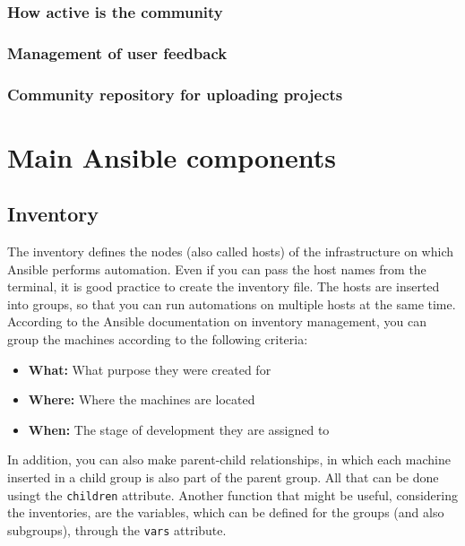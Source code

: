 \documentclass[12pt,a4paper,openright,twoside]{book}
\begin{document}
            \subsubsection{How active is the community}
            \subsubsection{Management of user feedback}
            \subsubsection{Community repository for uploading projects}

\section{Main Ansible components}

\subsection{Inventory}
            The inventory defines the nodes (also called hosts) of the infrastructure on which Ansible performs automation.
            Even if you can pass the host names from the terminal, it is good practice to create the inventory file.
            The hosts are inserted into groups, so that you can run automations on multiple hosts at the same time.
            According to the Ansible documentation on inventory management\cite{ansibleDocInventory}, you can group the machines according to the following criteria:
            
            \begin{itemize}
                \item \textbf{What:} What purpose they were created for
                \item \textbf{Where:} Where the machines are located
                \item \textbf{When:} The stage of development they are assigned to
            \end{itemize}
            
            In addition, you can also make parent-child relationships, in which each machine inserted in a child group is also part of the parent group. All that can be done usingt the \texttt{children} attribute.
            Another function that might be useful, considering the inventories, are the variables, which can be defined for the groups (and also subgroups), through the \texttt{vars} attribute.
\end{document}
